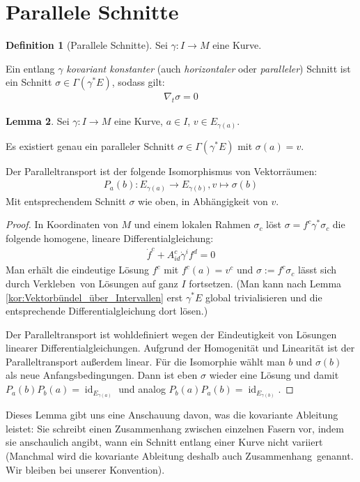 \documentclass[a4paper]{scrreprt}
\numberwithin{equation}{chapter}
\DeclareMathOperator{\id}{id}
\theoremstyle{definition}
\newtheorem{defn}{Definition}[section]
\newtheorem{lemma}[defn]{Lemma}
\begin{document}
	\section{Parallele Schnitte}
		\begin{defn}[Parallele Schnitte]
			Sei $\gamma\colon I\rightarrow M$ eine Kurve.
			
			Ein entlang $\gamma$ \emph{kovariant konstanter} (auch \emph{horizontaler} oder \emph{paralleler}) Schnitt ist ein Schnitt $\sigma\in\Gamma(\gamma^*E)$, sodass gilt:
			\begin{align*}
				\nabla_t\sigma=0
			\end{align*}
		\end{defn}
		\begin{lemma}
			Sei $\gamma\colon I\rightarrow M$ eine Kurve, $a\in I$, $v\in E_{\gamma(a)}$.
			
			Es existiert genau ein paralleler Schnitt $\sigma\in \Gamma(\gamma^*E)$ mit $\sigma(a)=v$.
			
			Der Paralleltransport ist der folgende Isomorphismus von Vektorräumen:
			\begin{align*}
				P_{a}(b)\colon E_{\gamma(a)}\rightarrow E_{\gamma(b)}, v\mapsto \sigma(b)
			\end{align*}
			Mit entsprechendem Schnitt $\sigma$ wie oben, in Abhängigkeit von $v$.
			\begin{proof}
				In Koordinaten von $M$ und einem lokalen Rahmen $\sigma_c$ löst $\sigma=f^c\gamma^*\sigma_c$ die folgende homogene, lineare Differentialgleichung:
				\begin{align*}
					\dot{f}^c+A^c_{id}\dot{\gamma}^i f^d=0
				\end{align*}
				Man erhält die eindeutige Lösung $f^c$ mit $f^c(a)=v^c$ und $\sigma:=f^c\sigma_c$ lässt sich durch \glqq Verkleben\grqq\ von Lösungen auf ganz $I$ fortsetzen. (Man kann nach Lemma \ref{kor:Vektorbündel_über_Intervallen} erst $\gamma^*E$ global trivialisieren und die entsprechende Differentialgleichung dort lösen.)
				
				Der Paralleltransport ist wohldefiniert wegen der Eindeutigkeit von Lösungen linearer Differentialgleichungen. Aufgrund der Homogenität und Linearität ist der Paralleltransport außerdem linear. Für die Isomorphie wählt man $b$ und $\sigma(b)$ als neue Anfangsbedingungen. Dann ist eben $\sigma$ wieder eine Lösung und damit $P_a(b)P_b(a)=\id_{E_{\gamma(a)}}$ und analog $P_b(a)P_a(b)=\id_{E_{\gamma(b)}}$.
			\end{proof}
		\end{lemma}
		Dieses Lemma gibt uns eine Anschauung davon, was die kovariante Ableitung leistet: Sie schreibt einen Zusammenhang zwischen einzelnen Fasern vor, indem sie anschaulich angibt, wann ein Schnitt entlang einer Kurve nicht variiert (Manchmal wird die kovariante Ableitung deshalb auch \glqq Zusammenhang\grqq\ genannt. Wir bleiben bei unserer Konvention).
		
\end{document}
